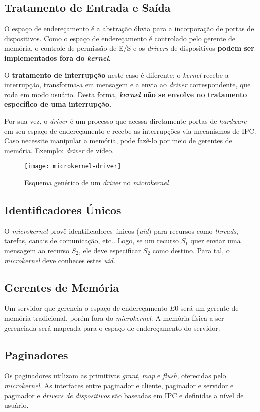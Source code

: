 \subsection{Tratamento de Entrada e Saída}
O espaço de endereçamento é a abstração óbvia para a incorporação de portas de dispositivos. Como o espaço de endereçamento é controlado pelo gerente de memória, o controle de permissão de E/S e os \textit{drivers} de dispositivos \textbf{podem ser implementados fora do \textit{kernel}}.

O \textbf{tratamento de interrupção} neste caso é diferente: o \textit{kernel} recebe a interrupção, transforma-a em mensagem e a envia ao \textit{driver} correspondente, que roda em modo usuário. Desta forma, \textbf{\textit{kernel} não se envolve no tratamento específico de uma interrupção}.

Por sua vez, o \textit{driver} é um processo que acessa diretamente portas de \textit{hardware} em seu espaço de endereçamento e recebe as interrupções via mecanismos de IPC. Caso necessite manipular a memória, pode fazê-lo por meio de gerentes de memória. \underline{Exemplo:} \textit{driver} de vídeo.

\begin{figure}[H]
  \centering
  \texttt{[image: microkernel-driver]}
  \caption{Esquema genérico de um \textit{driver} no \textit{microkernel}}
  \label{fig:microkernel-driver}
\end{figure}

\subsection{Identificadores Únicos}
O \textit{microkernel} provê identificadores únicos (\textit{uid}) para recursos como \textit{threads}, tarefas, canais de comunicação, etc.. Logo, se um recurso $S_1$ quer enviar uma mensagem ao recurso $S_2$, ele deve especificar $S_2$ como destino. Para tal, o \textit{microkernel} deve conheces estes \textit{uid}.

\subsection{Gerentes de Memória}
Um servidor que gerencia o espaço de endereçamento $E0$ será um gerente de memória tradicional, porém fora do \textit{microkernel}. A memória física a ser gerenciada será mapeada para o espaço de endereçamento do servidor.

\subsection{Paginadores}
Os paginadores utilizam as primitivas \textit{grant}, \textit{map} e \textit{flush}, oferecidas pelo \textit{microkernel}. As interfaces entre paginador e cliente, paginador e servidor e paginador e \textit{drivers de dispositivos} são baseadas em IPC e definidas a nível de usuário.









